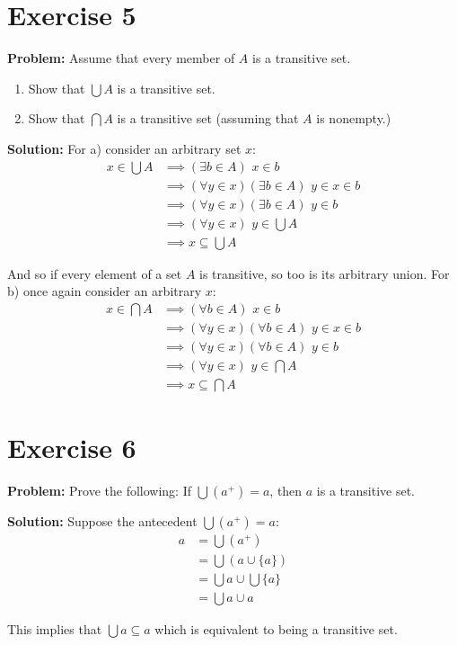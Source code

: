 \documentclass{article}
\begin{document}
\bigskip

\section*{Exercise 5}
\noindent\textbf{Problem:} Assume that every member of $A$ is a transitive set.
\begin{enumerate}[label=\alph*)]
    \item Show that $\bigcup A$ is a transitive set.
    \item Show that $\bigcap A$ is a transitive set (assuming that $A$ is nonempty.)
\end{enumerate}
\medskip

\noindent\textbf{Solution:} For a) consider an arbitrary set $x$:
\begin{align*}
    x\in\bigcup A&\implies(\exists b\in A)\,\,x\in b\tag{def. of arbitrary union}\\
    &\implies(\forall y\in x)(\exists b\in A)\,\,y\in x\in b\\
    &\implies(\forall y\in x)(\exists b\in A)\,\,y\in b\tag{$b$ is transitive}\\
    &\implies(\forall y\in x)\,\,y\in\bigcup A\tag{def. of arbitrary union}\\
    &\implies x\subseteq\bigcup A\tag{def. of subset}
\end{align*}

And so if every element of a set $A$ is transitive, so too is its arbitrary union. For b) once again consider an arbitrary $x$:
\begin{align*}
    x\in\bigcap A&\implies(\forall b\in A)\,\,x\in b\tag{def. of arbitrary intersection}\\
    &\implies(\forall y\in x)(\forall b\in A)\,\,y\in x\in b\\
    &\implies(\forall y\in x)(\forall b\in A)\,\,y\in b\tag{all $b$ are transitive}\\
    &\implies(\forall y\in x)\,\,y\in\bigcap A\tag{def. of arbitrary intersection}\\
    &\implies x\subseteq\bigcap A\tag{def. of subset}
\end{align*}

\section*{Exercise 6}
\noindent\textbf{Problem:} Prove the following: If $\bigcup(a^+)=a$, then $a$ is a transitive set.
\bigskip

\noindent\textbf{Solution:} Suppose the antecedent $\bigcup(a^+)=a$:
\begin{align*}
    a&=\bigcup(a^+)\tag{assumption}\\
    &=\bigcup(a\cup\{a\})\tag{def. of successor}\\
    &=\bigcup a\cup\bigcup \{a\}\tag{distributivity of union}\\
    &=\bigcup a\cup a
\end{align*}

This implies that $\bigcup a\subseteq a$ which is equivalent to being a transitive set.
\end{document}
